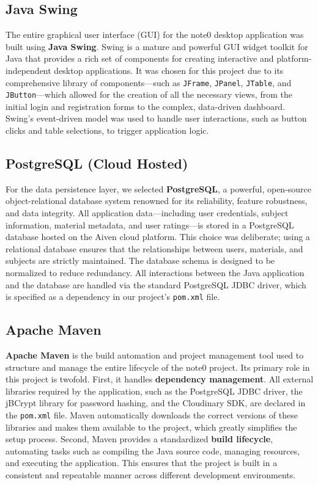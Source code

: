 \documentclass[12pt, a4paper]{report}
\begin{document}
\subsection{Java Swing}
The entire graphical user interface (GUI) for the note0 desktop application was built using \textbf{Java Swing}. Swing is a mature and powerful GUI widget toolkit for Java that provides a rich set of components for creating interactive and platform-independent desktop applications. It was chosen for this project due to its comprehensive library of components—such as \texttt{JFrame}, \texttt{JPanel}, \texttt{JTable}, and \texttt{JButton}—which allowed for the creation of all the necessary views, from the initial login and registration forms to the complex, data-driven dashboard. Swing's event-driven model was used to handle user interactions, such as button clicks and table selections, to trigger application logic.

\subsection{PostgreSQL (Cloud Hosted)}
For the data persistence layer, we selected \textbf{PostgreSQL}, a powerful, open-source object-relational database system renowned for its reliability, feature robustness, and data integrity. All application data—including user credentials, subject information, material metadata, and user ratings—is stored in a PostgreSQL database hosted on the Aiven cloud platform. This choice was deliberate; using a relational database ensures that the relationships between users, materials, and subjects are strictly maintained. The database schema is designed to be normalized to reduce redundancy. All interactions between the Java application and the database are handled via the standard PostgreSQL JDBC driver, which is specified as a dependency in our project's \texttt{pom.xml} file.

\subsection{Apache Maven}
\textbf{Apache Maven} is the build automation and project management tool used to structure and manage the entire lifecycle of the note0 project. Its primary role in this project is twofold. First, it handles \textbf{dependency management}. All external libraries required by the application, such as the PostgreSQL JDBC driver, the jBCrypt library for password hashing, and the Cloudinary SDK, are declared in the \texttt{pom.xml} file. Maven automatically downloads the correct versions of these libraries and makes them available to the project, which greatly simplifies the setup process. Second, Maven provides a standardized \textbf{build lifecycle}, automating tasks such as compiling the Java source code, managing resources, and executing the application. This ensures that the project is built in a consistent and repeatable manner across different development environments.
\end{document}
